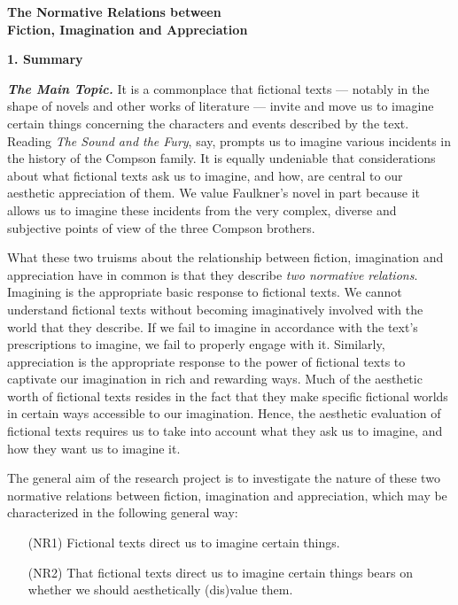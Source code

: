 \begin{center}
\noindent\textbf{\large The Normative Relations between\\ Fiction, Imagination and
Appreciation}
\end{center}


\noindent\textbf{\large 1. Summary}
\vspace{.1cm}

\noindent \textbf{\emph{The Main Topic.}} It is a commonplace that fictional texts --- notably in the shape of novels and other works of literature --- invite and move us to imagine certain things concerning the characters and events described by the text. Reading \emph{The Sound and the Fury}, say, prompts us to imagine various incidents in the history of the Compson family. It is equally undeniable that considerations about what fictional texts ask us to imagine, and how, are central to our aesthetic appreciation of them. We value Faulkner's novel in part because it allows us to imagine these incidents from the very complex, diverse and subjective points of view of the three Compson brothers.

What these two truisms about the relationship between fiction, imagination and appreciation have in common is that they describe \emph{two normative relations}. Imagining is the appropriate basic response to fictional texts. We cannot understand fictional texts without becoming imaginatively involved with the world that they describe. If we fail to imagine in accordance with the text's prescriptions to imagine, we fail to properly engage with it. Similarly, appreciation is the appropriate response to the power of fictional texts to captivate our imagination in rich and rewarding ways. Much of the aesthetic worth of fictional texts resides in the fact that they make specific fictional worlds in certain ways accessible to our imagination. Hence, the aesthetic evaluation of fictional texts requires us to take into account what they ask us to imagine, and how they want us to imagine it.

The general aim of the research project is to investigate the nature of these two normative relations between fiction, imagination and appreciation, which may be characterized in the following general way:


\vspace{-.1cm}
\begin{itemize}[leftmargin=2cm]
\item[{(NR1)}] Fictional texts direct us to imagine certain things.
\vspace{-.2cm}
\item[{(NR2)}] That fictional texts direct us to imagine certain things bears on whether we should aesthetically (dis)value them. 
\end{itemize}
\vspace{-.1cm}


